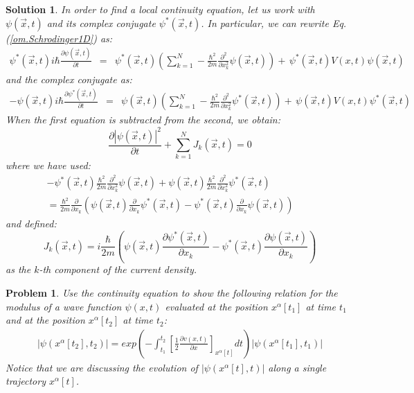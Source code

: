 \documentclass[nofootinbib, secnumarabic, amsmath, nobibnotes,11pt,aps,pra, floatfix]{revtex4-1}
\newtheorem{problem}{Problem}
\newtheorem{solution}{Solution}
\newcommand{\eref}[1]{Eq. (\ref{#1})}
\begin{document}
\begin{solution}

In order to find a local continuity equation, let us work with $\psi(\vec{x},t)$ and its complex conjugate $\psi^*(\vec x,t)$. In particular, we can rewrite \eref{om.Schrodinger1D} as:
\begin{eqnarray}
\psi^*(\vec x,t) i \hbar \frac{\partial \psi(\vec x,t)} {\partial t}
&=& \psi^*(\vec x,t)\left( \sum_{k = 1}^N -\frac{\hbar^2}{2m}\frac
{\partial^2} {\partial x_k^2} \psi(\vec x,t)\right) +\, \psi^*(\vec x,t) V(x,t) \psi(\vec x,t)\nonumber
\end{eqnarray}
and the complex conjugate as:
\begin{eqnarray}
-\psi(\vec x,t)i \hbar \frac{\partial \psi^*(\vec x,t)} {\partial t} &=& \psi(\vec x,t)\left( \sum_{k = 1}^N - \frac{\hbar^2}{2m}\frac {\partial^2} {\partial x_k^2} \psi^*(\vec x,t) \right)+\, \psi(\vec x,t)V(x,t) \psi^*(\vec x,t)\nonumber
\end{eqnarray}
When the first equation is subtracted from the second, we obtain:
\begin{equation}
\frac{\partial |\psi(\vec{x},t)|^2} {\partial t} + \sum_{k = 1}^{N} J_k(\vec{x},t) = 0\nonumber
\end{equation}
where we have used:
\begin{eqnarray}
- \psi^*(\vec x,t)\frac{\hbar^2}{2m}\frac {\partial^2} {\partial x_k^2} \psi(\vec x,t) + \psi(\vec x,t)\frac{\hbar^2}{2m}\frac {\partial^2} {\partial x_k^2} \psi^*(\vec x,t) \nonumber\\= \frac{\hbar^2}{2m} \frac {\partial} {\partial x_k} \left( \psi(\vec x,t)\frac {\partial} {\partial x_k} \psi^*(\vec x,t)-\psi^*(\vec x,t)\frac {\partial} {\partial x_k} \psi(\vec x,t) \right)\qquad\nonumber
\end{eqnarray}
and defined:
\begin{equation}
J_k(\vec{x},t) = i \frac {\hbar} {2 m} \left( \psi(\vec{x},t) \frac {\partial \psi^{*}(\vec{x},t)} {\partial x_k}- \psi^{*}(\vec{x},t) \frac {\partial \psi(\vec{x},t)} {\partial x_k} \right)\nonumber
\end{equation}
as the $k$-th component of the current density.
\end{solution}

\begin{problem} \label{om.P9}
Use the continuity equation to show the following relation for the modulus of a wave function $\psi(x,t)$ evaluated at the position $x^{\alpha}[t_1]$ at time $t_1$ and at the position $x^{\alpha}[t_2]$ at time $t_2$:
\begin{eqnarray}
|\psi(x^{\alpha}[t_2],t_2)|=exp\left(-\int_{t_1}^{t_2}\left[\frac{1}{2}\frac{\partial v(x,t)}{\partial x}\right]_{x^{\alpha}[t]}dt \right) |\psi(x^{\alpha}[t_1],t_1)|\nonumber
\end{eqnarray}
Notice that we are discussing the evolution of $|\psi(x^{\alpha}[t],t)|$ along a single trajectory  $x^{\alpha}[t]$.
\end{problem}
\end{document}
